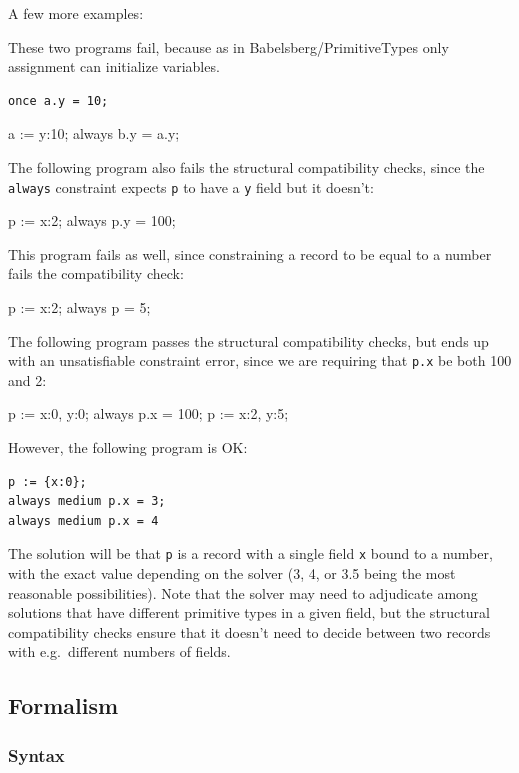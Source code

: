 \documentclass{article}
\newcounter{examples}
\begin{document}
A few more examples:

These two programs fail, because as in Babelsberg/PrimitiveTypes only
assignment can initialize variables.
\begin{verbatim}
once a.y = 10;
\end{verbatim}

\begin{example}
a := {y:10};
always b.y = a.y;
\end{example}

The following program also fails the structural compatibility checks, since
the \verb|always| constraint expects \verb|p| to have a \verb|y| field
but it doesn't:
\begin{example}
p := {x:2};
always p.y = 100;
\end{example}

This program fails as well, since constraining a record to be equal to
a number fails the compatibility check:
\begin{example}
p := {x:2};
always p = 5;
\end{example}

The following program passes the structural compatibility checks, but
ends up with an unsatisfiable constraint error, since we are requiring
that \verb|p.x| be both 100 and 2:
\begin{example}  
p := {x:0, y:0};
always p.x = 100;
p := {x:2, y:5};
\end{example}

However, the following program is OK:
\begin{verbatim} 
p := {x:0};
always medium p.x = 3;
always medium p.x = 4
\end{verbatim}
The solution will be that \verb|p| is a record with a single field
\verb|x| bound to a number, with the exact value depending on the
solver (3, 4, or 3.5 being the most reasonable possibilities).  Note
that the solver may need to adjudicate among solutions that have
different primitive types in a given field, but the structural
compatibility checks ensure that it doesn't need to decide between
two records with e.g.\ different numbers of fields.

\subsection{Formalism}

\subsubsection{Syntax}
\end{document}
